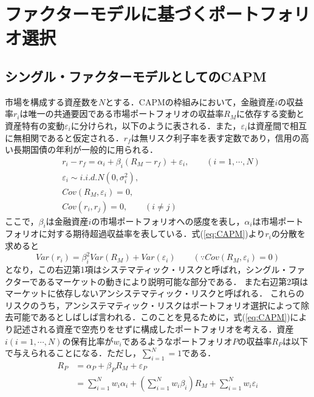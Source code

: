 \documentclass[11pt]{jreport}
\begin{document}
\chapter{ファクターモデルに基づくポートフォリオ選択}
\section{シングル・ファクターモデルとしてのCAPM}
市場を構成する資産数を$N$とする．CAPMの枠組みにおいて，金融資産$i$の収益率$r_i$は唯一の共通要因である市場ポートフォリオの収益率$R_M$に依存する変動と資産特有の変動$\varepsilon_i$に分けられ，以下のように表される．また，$\varepsilon_i$は資産間で相互に無相関であると仮定される．$r_f$は無リスク利子率を表す定数であり，信用の高い長期国債の年利が一般的に用られる．
\begin{equation}
\begin{split}
&r_i - r_f = \alpha_i + \beta_i(R_M - r_f) + \varepsilon_i,\qquad(i=1,\cdots,N)\\
&\varepsilon_i \sim i.i.d.N(0,\sigma_i^2),\\
&Cov(R_M, \varepsilon_i) = 0,\\
&Cov(r_i, r_j) = 0, \qquad (i \neq j)
\label{eq:CAPM}
\end{split}
\end{equation}
ここで，$\beta_i$は金融資産$i$の市場ポートフォリオへの感度を表し，$\alpha_i$は市場ポートフォリオに対する期待超過収益率を表している．式(\ref{eq:CAPM})より$r_i$の分散を求めると
\begin{equation}
Var(r_i) = \beta_i^2Var(R_M) + Var(\varepsilon_i) \qquad (\text{∵}Cov(R_M, \varepsilon_i) = 0)
\label{eq:CAPM_var}
\end{equation}
となり，この右辺第1項はシステマティック・リスクと呼ばれ，シングル・ファクターであるマーケットの動きにより説明可能な部分である．
また右辺第2項はマーケットに依存しないアンシステマティック・リスクと呼ばれる．
これらのリスクのうち，アンシステマティック・リスクはポートフォリオ選択によって除去可能であるとしばしば言われる．このことを見るために，式(\ref{eq:CAPM})により記述される資産で空売りをせずに構成したポートフォリオを考える．資産$i(i=1,\cdots,N)$の保有比率が$w_i$であるようなポートフォリオ$P$の収益率$R_P$は以下で与えられることになる．ただし，$\sum_{i=1}^N = 1$である．
\begin{equation}
\begin{split}
R_P &= \alpha_P + \beta_PR_M + \varepsilon_P\\
&= \sum_{i=1}^N w_i\alpha_i
+\left(\sum_{i=1}^N w_i\beta_i\right)R_M
+\sum_{i=1}^N w_i\varepsilon_i
\end{split}
\end{equation}
\end{document}
